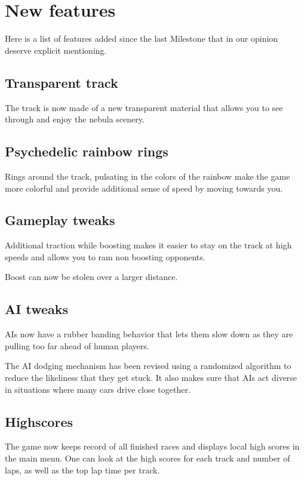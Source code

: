 \documentclass[11pt]{article}
\begin{document}
\section{New features}
\label{new-features}

Here is a list of features added since the last Milestone that in our opinion
deserve explicit mentioning.

\subsection{Transparent track}

The track is now made of a new transparent material that allows you to see
through and enjoy the nebula scenery.

\subsection{Psychedelic rainbow rings}

Rings around the track, pulsating in the colors of the rainbow make the game
more colorful and provide additional sense of speed by moving towards you.

\subsection{Gameplay tweaks}

Additional traction while boosting makes it easier to stay on the track at high
speeds and allows you to ram non boosting opponents.

Boost can now be stolen over a larger distance.

\subsection{AI tweaks}

AIs now have a rubber banding behavior that lets them slow down as they are
pulling too far ahead of human players.

The AI dodging mechanism has been revised using a randomized algorithm to
reduce the likeliness that they get stuck. It also makes sure that AIs act
diverse in situations where many cars drive close together.

\subsection{Highscores}

The game now keeps record of all finished races and displays local high scores
in the main menu. One can look at the high scores for each track and number of
laps, as well as the top lap time per track.
\end{document}

